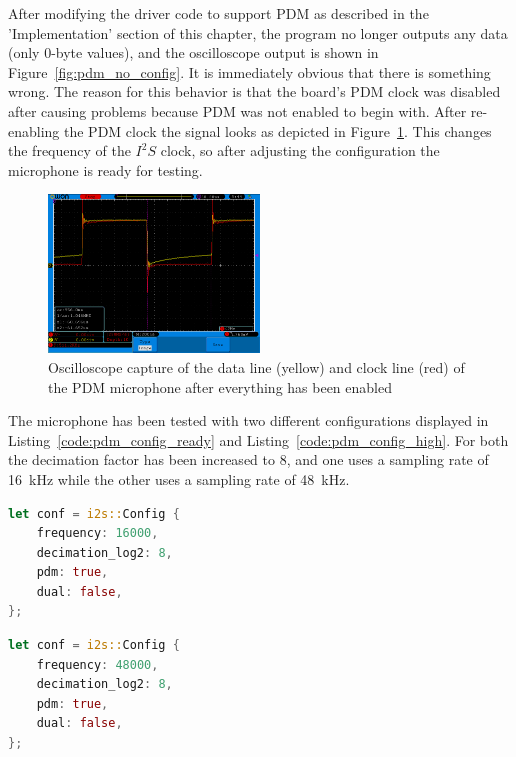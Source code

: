 After modifying the driver code to support PDM as described in the 'Implementation' section of this chapter,
the program no longer outputs any data (only 0-byte values), and the oscilloscope output is shown in Figure~\ref{fig:pdm_no_config}.
It is immediately obvious that there is something wrong.
The reason for this behavior is that the board's PDM clock was disabled after causing problems because PDM was not enabled to begin with.
After re-enabling the PDM clock the signal looks as depicted in Figure~\ref{fig:pdm_working}.
This changes the frequency of the $I^2S$ clock, so after adjusting the configuration the microphone is ready for testing.

\begin{figure}[H]
    \begin{center}
        \includegraphics[width=0.5\textwidth]{figures/pdm_working.png}
    \end{center}
    \caption[Oscilloscope capture of the data line (yellow) and clock line (red) of the PDM microphone after everything has been enabled]{Oscilloscope capture of the data line (yellow) and clock line (red) of the PDM microphone after everything has been enabled}
    \label{fig:pdm_working}
\end{figure}

\begin{minipage}{\textwidth}
The microphone has been tested with two different configurations displayed in Listing~\ref{code:pdm_config_ready} and Listing~\ref{code:pdm_config_high}.
For both the decimation factor has been increased to 8, and one uses a sampling rate of \SI{16}{\kilo\hertz} while the other uses a sampling rate of \SI{48}{\kilo\hertz}.

\begin{lstlisting}[style=colorEX,language=Rust,caption={Updated configuration of the PDM microphone with a 16kHz sampling rate},label={code:pdm_config_ready}]
let conf = i2s::Config {
    frequency: 16000,
    decimation_log2: 8,
    pdm: true,
    dual: false,
};
\end{lstlisting}

\begin{lstlisting}[style=colorEX,language=Rust,caption={Updated configuration of the PDM microphone with a 48 sampling rate},label={code:pdm_config_high}]
let conf = i2s::Config {
    frequency: 48000,
    decimation_log2: 8,
    pdm: true,
    dual: false,
};
\end{lstlisting}
\end{minipage}

